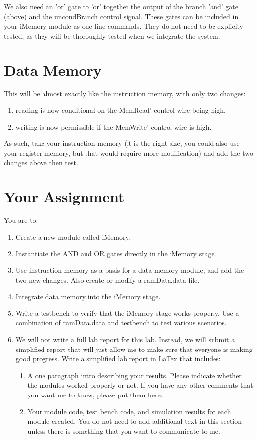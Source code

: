 We also need an 'or' gate to 'or' together the output of the branch 'and' gate (above) and the uncondBranch control signal.  These gates can be included in your iMemory module as one line commands.  They do not need to be explicity tested, as they will be thoroughly tested when we integrate the system.  

\section{Data Memory}

This will be almost exactly like the instruction memory, with only two changes:
\begin{enumerate}
\item reading is now conditional on the MemRead' control wire being high.
\item writing is now permissible if the MemWrite' control wire is high.
\end{enumerate}
As such, take your instruction memory (it is the right size, you could also use your register memory, but that would require more modification) and add the two changes above then test.

\section{Your Assignment}

You are to:
\begin{enumerate}
\item Create a new module called iMemory.
\item Instantiate the AND and OR gates directly in the iMemory stage.
\item Use instruction memory as a basis for a data memory module, and add the two new changes.  Also create or modify a ramData.data file.
\item Integrate data memory into the iMemory stage.  
\item Write a testbench to verify that the iMemory stage works properly. Use a combination of ramData.data and testbench to test various scenarios.
\item We will not write a full lab report for this lab.  Instead, we will submit a simplified report that will just allow me to make sure that everyone is making good progress.  Write a simplified lab report in LaTex that includes:
\begin{enumerate}
	\item  A one paragraph intro describing your results.  Please indicate whether the modules worked properly or not.  If you have any other comments that you want me to know, please put them here.
	\item Your module code, test bench code, and simulation results for each module created.  You do not need to add additional text in this section unless there is something that you want to communicate to me.
\end{enumerate} 
\end{enumerate} 